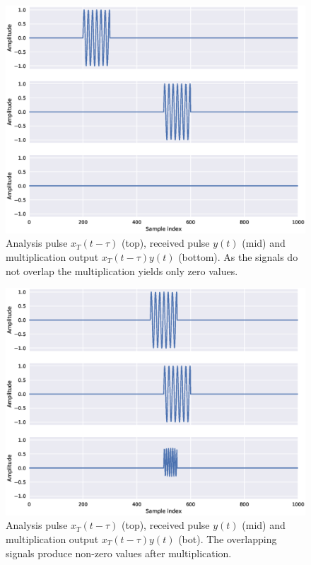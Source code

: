 \begin{figure}[t]
	\centering
	\includegraphics[scale=0.5]{figs_temp/mixing0}
	\caption{Analysis pulse $x_T(t-\tau)$ (top), received pulse $y(t)$ (mid) and multiplication output $x_T(t-\tau)y(t)$ (bottom). As the signals do not overlap the multiplication yields only zero values.}
	\label{fig:mix0}
\end{figure}

\begin{figure}[t]
	\centering
	\includegraphics[scale=0.5]{figs_temp/mixing1}
	\caption{Analysis pulse $x_T(t-\tau)$ (top), received pulse $y(t)$ (mid) and multiplication output $x_T(t-\tau)y(t)$ (bot). The overlapping signals produce non-zero values after multiplication.}
	\label{fig:mix1}
\end{figure}

